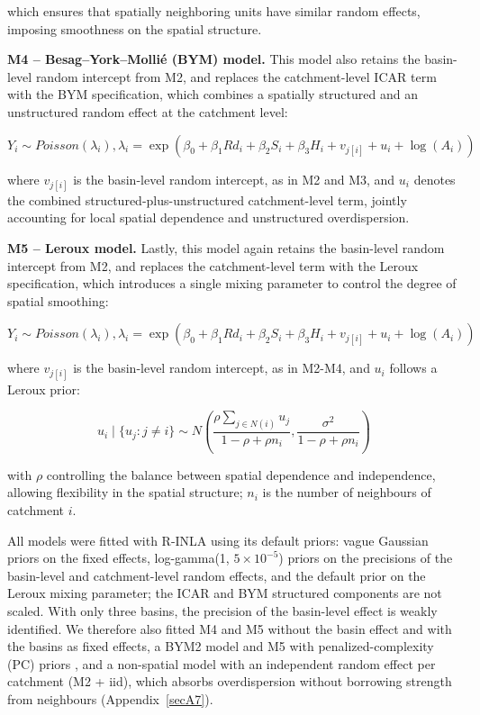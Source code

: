 \documentclass[journal abbreviation, manuscript]{copernicus}
\newcommand{\hl}[1]{#1}
\newcommand{\hlE}[1]{#1}
\begin{document}
\hl{which ensures that spatially neighboring units have similar random effects, imposing smoothness on the spatial structure.}

\hl{\textbf{M4 -- Besag--York--Molli\'{e} (BYM) model.} This model also retains the basin-level random intercept from M2, and replaces the catchment-level ICAR term with the BYM specification, which combines a spatially structured and an unstructured random effect at the catchment level:}

\begin{equation}
Y_i \sim Poisson(\lambda_i), \lambda_i = \exp(\beta_0 + \beta_1 Rd_i + \beta_2 S_i + \beta_3 H_i + v_{j[i]} + u_i + \log(A_i))
\end{equation}

\hl{where $v_{j[i]}$ is the basin-level random intercept, as in M2 and M3, and $u_i$ denotes the combined structured-plus-unstructured catchment-level term, jointly accounting for local spatial dependence and unstructured overdispersion.}

\hl{\textbf{M5 -- Leroux model.} Lastly, this model again retains the basin-level random intercept from M2, and replaces the catchment-level term with the Leroux specification, which introduces a single mixing parameter to control the degree of spatial smoothing:}

\begin{equation}
Y_i \sim Poisson(\lambda_i), \lambda_i = \exp(\beta_0 + \beta_1 Rd_i + \beta_2 S_i + \beta_3 H_i + v_{j[i]} + u_i + \log(A_i))
\end{equation}

\hl{where $v_{j[i]}$ is the basin-level random intercept, as in M2-M4, and $u_i$ follows a Leroux prior:}

\begin{equation}
u_i \mid \{u_j : j \neq i\} \sim N \left( \frac{\rho \sum_{j \in N(i)} u_j}{1 - \rho + \rho n_i}, \frac{\sigma^2}{1 - \rho + \rho n_i} \right)
\end{equation}

\hl{with $\rho$ controlling the balance between spatial dependence and independence, allowing flexibility in the spatial structure}\hlE{; $n_i$ is the number of neighbours of catchment $i$.}

\hlE{All models were fitted with R-INLA }\citep{rue2009approximate}\hlE{ using its default priors: vague Gaussian priors on the fixed effects, log-gamma(1, $5 \times 10^{-5}$) priors on the precisions of the basin-level and catchment-level random effects, and the default prior on the Leroux mixing parameter; the ICAR and BYM structured components are not scaled. With only three basins, the precision of the basin-level effect is weakly identified. We therefore also fitted M4 and M5 without the basin effect and with the basins as fixed effects, a BYM2 model and M5 with penalized-complexity (PC) priors }\citep{simpson2017penalising}\hlE{, and a non-spatial model with an independent random effect per catchment (M2 + iid), which absorbs overdispersion without borrowing strength from neighbours (\mbox{Appendix~\ref{secA7}}).}
\end{document}
